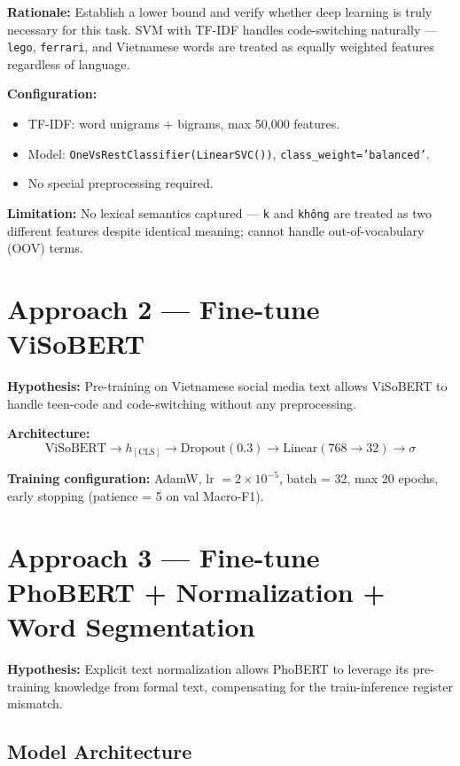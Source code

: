\documentclass[12pt, a4paper]{report}
\begin{document}
\textbf{Rationale:} Establish a lower bound and verify whether deep learning
is truly necessary for this task.
SVM with TF-IDF handles code-switching naturally ---
\texttt{lego}, \texttt{ferrari}, and Vietnamese words are treated as
equally weighted features regardless of language.

\textbf{Configuration:}
\begin{itemize}
  \item TF-IDF: word unigrams + bigrams, max 50,000 features.
  \item Model: \texttt{OneVsRestClassifier(LinearSVC())},
        \texttt{class\_weight='balanced'}.
  \item No special preprocessing required.
\end{itemize}

\textbf{Limitation:} No lexical semantics captured ---
\texttt{k} and \texttt{kh\^ong} are treated as two different features
despite identical meaning; cannot handle out-of-vocabulary (OOV) terms.

\section{Approach 2 --- Fine-tune ViSoBERT}

\textbf{Hypothesis:} Pre-training on Vietnamese social media text
allows ViSoBERT to handle teen-code and code-switching
without any preprocessing.

\textbf{Architecture:}
\begin{equation}
  \text{ViSoBERT} \rightarrow h_{[\text{CLS}]} \rightarrow \text{Dropout}(0.3)
  \rightarrow \text{Linear}(768 \rightarrow 32) \rightarrow \sigma
\end{equation}

\textbf{Training configuration:} AdamW, lr $= 2 \times 10^{-5}$,
batch = 32, max 20 epochs, early stopping (patience = 5 on val Macro-F1).

\section{Approach 3 --- Fine-tune PhoBERT + Normalization + Word Segmentation}
\label{sec:approach3}

\textbf{Hypothesis:} Explicit text normalization allows PhoBERT to leverage
its pre-training knowledge from formal text,
compensating for the train-inference register mismatch.

\subsection{Model Architecture}
\label{subsec:approach3_arch}
\end{document}
